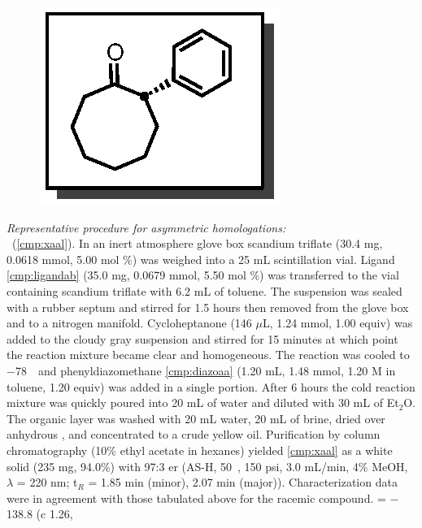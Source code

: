 \pagebreak
\begin{figure}
  \vspace{-22pt}
  \begin{center}
    \includegraphics[scale=0.8]{chp_asymmetric/images/xaal}
  \end{center}
  \vspace{-30pt}
\end{figure}\noindent \textit{Representative procedure for asymmetric
homologations:} \\ \textbf{\CMPxaal}\ (\ref{cmp:xaal}). In an inert atmosphere
glove box scandium triflate (30.4 mg, 0.0618 mmol, 5.00 mol \%) was weighed into
a 25 mL scintillation vial. Ligand \ref{cmp:ligandab} (35.0 mg, 0.0679 mmol,
5.50 mol \%) was transferred to the vial containing scandium triflate with 6.2
mL of toluene. The suspension was sealed with a rubber septum and stirred for
1.5 hours then removed from the glove box and to a nitrogen manifold.
Cycloheptanone (146 $\mu$L, 1.24 mmol, 1.00 equiv) was added to the cloudy gray
suspension and stirred for 15 minutes at which point the reaction mixture became
clear and homogeneous. The reaction was cooled to $-$78~\degc\  and
phenyldiazomethane \ref{cmp:diazoaa} (1.20 mL, 1.48 mmol, 1.20 M in
toluene, 1.20 equiv) was added in a single portion. After 6 hours the cold
reaction mixture was quickly poured into 20 mL of water and diluted with 30 mL
of Et$_2$O. The organic layer was washed with 20 mL water, 20 mL of brine,
dried over anhydrous , and concentrated to a crude yellow oil.
Purification by column chromatography (10\% ethyl acetate in hexanes) yielded \ref{cmp:xaal} as a white solid (235 mg, 94.0\%) with 97:3 er (AS-H,
50~\degc, 150 psi, 3.0 mL/min, 4\% MeOH, $\lambda$ = 220 nm; t$_R$ = 1.85 min
(minor), 2.07 min (major)). Characterization data were in agreement with those
tabulated above for the racemic compound. \rotation = $-$138.8 (c 1.26,
